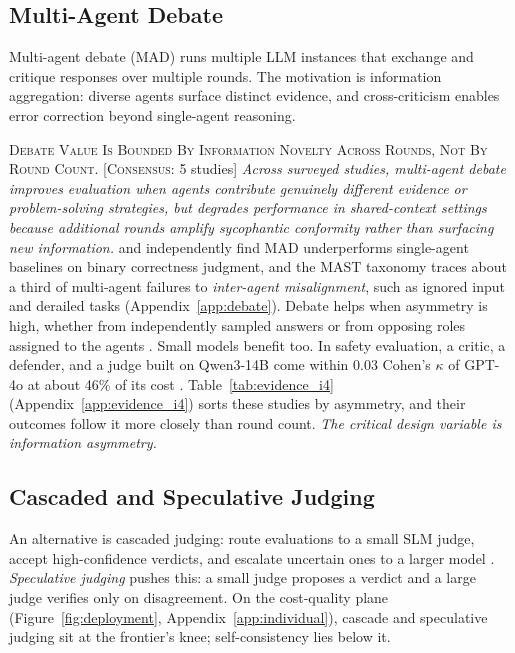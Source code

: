 \documentclass[11pt]{article}
\begin{document}
\subsection{Multi-Agent Debate}

Multi-agent debate (MAD) \citep{du2024improving} runs multiple LLM instances that exchange and critique responses over multiple rounds. The motivation is information aggregation: diverse agents surface distinct evidence, and cross-criticism enables error correction beyond single-agent reasoning.

\textsc{Debate Value Is Bounded By Information Novelty Across Rounds, Not By Round Count.} [\textsc{Consensus}: 5 studies] \textit{Across surveyed studies, multi-agent debate improves evaluation when agents contribute genuinely different evidence or problem-solving strategies, but degrades performance in shared-context settings because additional rounds amplify sycophantic conformity rather than surfacing new information.} \citet{wynn2025talk} and \citet{zhang2025stop} independently find MAD underperforms single-agent baselines on binary correctness judgment, and the MAST taxonomy \citep{cemri2026multi} traces about a third of multi-agent failures to \emph{inter-agent misalignment}, such as ignored input and derailed tasks (Appendix~\ref{app:debate}). Debate helps when asymmetry is high, whether from independently sampled answers \citep{du2024improving} or from opposing roles assigned to the agents \citep{liang2024encouraging}. Small models benefit too. In safety evaluation, a critic, a defender, and a judge built on Qwen3-14B come within 0.03 Cohen's $\kappa$ of GPT-4o at about 46\% of its cost \citep{lin2025efficient}. Table~\ref{tab:evidence_i4} (Appendix~\ref{app:evidence_i4}) sorts these studies by asymmetry, and their outcomes follow it more closely than round count. \textit{The critical design variable is information asymmetry.}

\subsection{Cascaded and Speculative Judging}

An alternative is cascaded judging: route evaluations to a small SLM judge, accept high-confidence verdicts, and escalate uncertain ones to a larger model \citep{jung2025trust}. \emph{Speculative judging} pushes this: a small judge proposes a verdict and a large judge verifies only on disagreement. On the cost-quality plane (Figure~\ref{fig:deployment}, Appendix~\ref{app:individual}), cascade and speculative judging sit at the frontier's knee; self-consistency lies below it.
\end{document}

